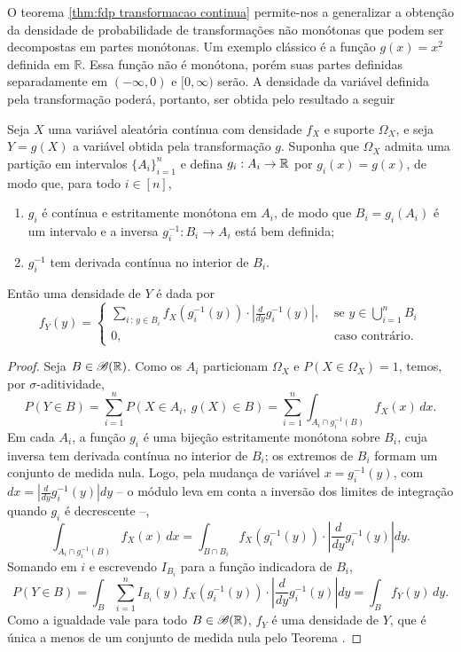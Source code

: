 O teorema \ref{thm:fdp transformacao continua} permite-nos a generalizar a obtenção da
densidade de probabilidade de transformações não monótonas que podem ser decompostas em
partes monótonas. Um exemplo clássico é a função $g(x) = x^2$ definida em $\mathbb{R}$.
Essa função não é monótona, porém suas partes definidas separadamente em $(-\infty, 0)$ e
$[0, \infty)$ serão.
A densidade da variável definida pela transformação poderá, portanto, ser obtida pelo
resultado a seguir

\begin{thm:fdp transformacao nao monotona continua}
\label{thm:fdp transformacao nao monotona continua}
Seja $X$ uma variável aleatória contínua com densidade $f_X$ e suporte $\Omega_X$, e seja
$Y=g(X)$ a variável obtida pela transformação $g$.
Suponha que $\Omega_X$ admita uma partição em intervalos $\{A_i\}_{i=1}^n$ e defina
$g_i: A_i \to \mathbb{R}$ por $g_i(x) = g(x)$, de modo que, para todo $i \in [n]$,
\begin{enumerate}
	\item[i] $g_i$ é contínua e estritamente monótona em $A_i$, de modo que
	      $B_i = g_i(A_i)$ é um intervalo e a inversa $g_i^{-1}: B_i \to A_i$ está bem definida;
	\item[ii] $g_i^{-1}$ tem derivada contínua no interior de $B_i$.
\end{enumerate}
Então uma densidade de $Y$ é dada por
\[
	f_{Y}(y) = \begin{cases}
		\displaystyle\sum_{i \,:\, y \in B_i} f_{X}(g_i^{-1}(y)) \cdot \left| \frac{d}{dy} g_i^{-1}(y)\right|, & \text{ se } y \in \bigcup_{i=1}^n B_i \\
		0, & \text{ caso contrário.}
	\end{cases}
\]
\begin{proof}
	Seja $B \in \mathcal{B}(\mathbb{R})$.
	Como os $A_i$ particionam $\Omega_X$ e $P(X \in \Omega_X) = 1$, temos, por
	$\sigma$-aditividade,
	\[
		P(Y \in B) = \sum_{i=1}^n P(X \in A_i,\ g(X) \in B) =
		\sum_{i=1}^n \int_{A_i \cap g_i^{-1}(B)} f_X(x)\, dx.
	\]
	Em cada $A_i$, a função $g_i$ é uma bijeção estritamente monótona sobre $B_i$, cuja
	inversa tem derivada contínua no interior de $B_i$; os extremos de $B_i$ formam um
	conjunto de medida nula.
	Logo, pela mudança de variável $x = g_i^{-1}(y)$, com $dx = \left|\frac{d}{dy}g_i^{-1}(y)\right| dy$
	-- o módulo leva em conta a inversão dos limites de integração quando $g_i$ é decrescente --,
	\[
		\int_{A_i \cap g_i^{-1}(B)} f_X(x)\, dx =
		\int_{B \cap B_i} f_X(g_i^{-1}(y)) \cdot \left|\frac{d}{dy}g_i^{-1}(y)\right| dy.
	\]
	Somando em $i$ e escrevendo $I_{B_i}$ para a função indicadora de $B_i$,
	\[
		P(Y \in B) =
		\int_B \sum_{i=1}^n I_{B_i}(y)\, f_X(g_i^{-1}(y)) \cdot \left|\frac{d}{dy}g_i^{-1}(y)\right| dy =
		\int_B f_Y(y)\, dy.
	\]
	Como a igualdade vale para todo $B \in \mathcal{B}(\mathbb{R})$, $f_Y$ é uma densidade de $Y$, que é
	única a menos de um conjunto de medida nula pelo Teorema .
\end{proof}
\end{thm:fdp transformacao nao monotona continua}

